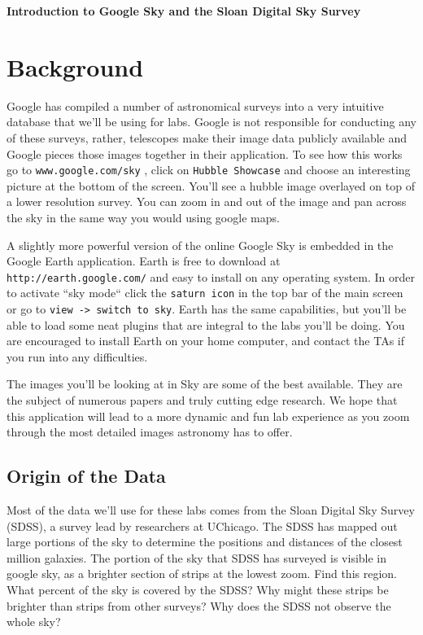 \documentclass[12pt]{article}
\begin{document}
\vspace*{-.7in}
\vspace{.7in}
\centerline{\large\bf Introduction to Google Sky and the Sloan Digital Sky Survey}
\vspace{.2in}


\section*{Background}
Google has compiled a number of astronomical surveys into a very intuitive database that we'll be using for labs. Google is not responsible for conducting any of these surveys, rather, telescopes make their image data publicly available and Google pieces those images together in their application. To see how this works go to \texttt{www.google.com/sky} , click on \texttt{Hubble Showcase} and choose an interesting picture at the bottom of the screen. You'll see a hubble image overlayed on top of a lower resolution survey. You can zoom in and out of the image and pan across the sky in the same way you would using google maps. 

A slightly more powerful version of the online Google Sky is embedded in the Google Earth application. Earth is free to download at \texttt{http://earth.google.com/} and easy to install on any operating system. In order to activate ``sky mode`` click the \texttt{saturn icon} in the top bar of the main screen or go to \texttt{view -> switch to sky}. Earth has the same capabilities, but you'll be able to load some neat plugins that are integral to the labs you'll be doing. You are encouraged to install Earth on your home computer, and contact the TAs if you run into any difficulties. 

The images you'll be looking at in Sky are some of the best available. They are the subject of numerous papers and truly cutting edge research. We hope that this application will lead to a more dynamic and fun lab experience as you zoom through the most detailed images astronomy has to offer.

\subsection*{Origin of the Data}
Most of the data we'll use for these labs comes from the Sloan Digital Sky Survey (SDSS), a survey lead by researchers at UChicago. The SDSS has mapped out large portions of the sky to determine the positions and distances of the closest million galaxies. The portion of the sky that SDSS has surveyed is visible in google sky, as a brighter section of strips at the lowest zoom. Find this region. What percent of the sky is covered by the SDSS? Why might these strips be brighter than strips from other surveys? Why does the SDSS not observe the whole sky? 
\end{document}
